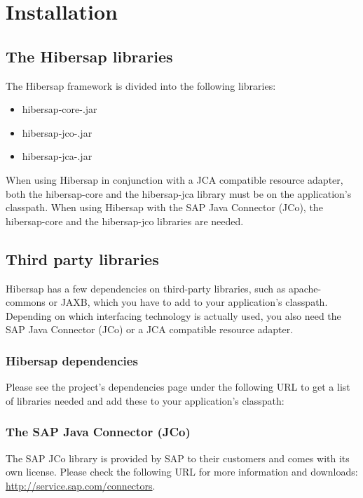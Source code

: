 \chapter{Installation}
\label{cha:Installation}

\section{The Hibersap libraries}

The Hibersap framework is divided into the following libraries:
\begin{itemize}
  \item hibersap-core-\HibersapVersion.jar
  \item hibersap-jco-\HibersapVersion.jar
  \item hibersap-jca-\HibersapVersion.jar
\end{itemize}

When using Hibersap in conjunction with a JCA compatible resource adapter, both the hibersap-core and the hibersap-jca library must be on the application's classpath. When using Hibersap with the SAP Java Connector (JCo), the hibersap-core and the hibersap-jco libraries are needed. 

\section{Third party libraries}
Hibersap has a few dependencies on third-party libraries, such as apache-commons or JAXB, which you have to add to your application's classpath. Depending on which interfacing technology is actually used, you also need the SAP Java Connector (JCo) or a JCA compatible resource adapter. 

\subsection{Hibersap dependencies}
Please see the project's dependencies page under the following URL to get a list of libraries needed and add these to your application's classpath: \urlHibersapDependencies

\subsection{The SAP Java Connector (JCo)}
The SAP JCo library is provided by SAP to their customers and comes with its own license. Please check the following URL for more information and downloads: \url{http://service.sap.com/connectors}.


